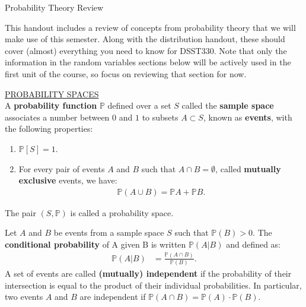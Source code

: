 \documentclass{tufte-handout}
\newcommand{\Prob}{\mathbb{P}}
\begin{document}
\justify

{\LARGE Probability Theory Review}

\vspace*{18pt}

\noindent
This handout includes a review of concepts from probability theory
that we will make use of this semester. Along with the distribution
handout, these should cover (almost) everything you need to know 
for DSST330. Note that only the information in the
random variables sections below will be actively used in the first
unit of the course, so focus on reviewing that section for now.

\vspace*{18pt}

\noindent
\underline{PROBABILITY SPACES} \\
A \textbf{probability function} $\Prob$ defined over a set $S$ called the
\textbf{sample space} associates a number between $0$ and $1$ to subsets
$A \subset S$, known as \textbf{events}, with the following properties:
\begin{enumerate}
\item $\Prob[S] = 1$.
\item For every pair of events $A$ and $B$ such that $A \cap B = \emptyset$,
called \textbf{mutually exclusive} events, we have:
\begin{align*}
\Prob \left( A \cup B \right) = \mathbb{P}A + \mathbb{P}B.
\end{align*}
\end{enumerate}
The pair $(S, \mathbb{P})$ is called a probability space.

Let $A$ and $B$ be events from a sample space $S$ such that 
$\mathbb{P}(B) > 0$. The \textbf{conditional probability} of A given B
is written $\mathbb{P}(A | B)$ and defined as:
\begin{align*}
\mathbb{P}(A | B) &= \frac{\mathbb{P}(A \cap B)}{\mathbb{P}(B)}.
\end{align*}
A set of events are called \textbf{(mutually) independent} if the
probability of their intersection is equal to the product of their
individual probabilities. In particular, two events $A$ and $B$ are
independent if $\mathbb{P}(A \cap B) = \mathbb{P}(A) \cdot \mathbb{P}(B)$.

\vspace*{18pt}
\end{document}
